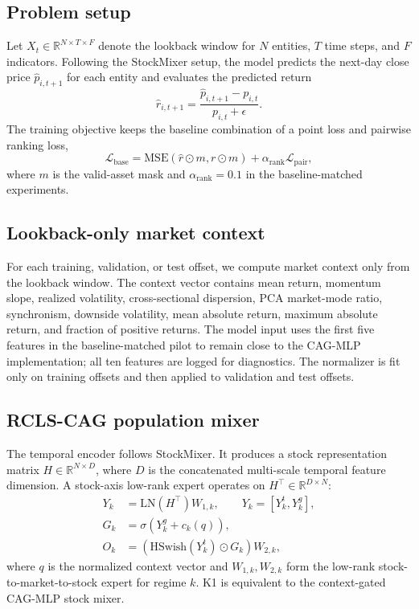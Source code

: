 \documentclass{article}
\begin{document}
\subsection{Problem setup}

Let $X_t \in \mathbb{R}^{N \times T \times F}$ denote the lookback window for $N$ entities, $T$ time steps, and $F$ indicators. Following the StockMixer setup, the model predicts the next-day close price $\hat{p}_{i,t+1}$ for each entity and evaluates the predicted return
\begin{equation}
    \hat{r}_{i,t+1} = \frac{\hat{p}_{i,t+1} - p_{i,t}}{p_{i,t} + \epsilon}.
\end{equation}
The training objective keeps the baseline combination of a point loss and pairwise ranking loss,
\begin{equation}
    \mathcal{L}_{\mathrm{base}} =
    \mathrm{MSE}(\hat{r} \odot m, r \odot m) +
    \alpha_{\mathrm{rank}}\mathcal{L}_{\mathrm{pair}},
\end{equation}
where $m$ is the valid-asset mask and $\alpha_{\mathrm{rank}}=0.1$ in the baseline-matched experiments.

\subsection{Lookback-only market context}

For each training, validation, or test offset, we compute market context only from the lookback window. The context vector contains mean return, momentum slope, realized volatility, cross-sectional dispersion, PCA market-mode ratio, synchronism, downside volatility, mean absolute return, maximum absolute return, and fraction of positive returns. The model input uses the first five features in the baseline-matched pilot to remain close to the CAG-MLP implementation; all ten features are logged for diagnostics. The normalizer is fit only on training offsets and then applied to validation and test offsets.

\subsection{RCLS-CAG population mixer}

The temporal encoder follows StockMixer. It produces a stock representation matrix $H \in \mathbb{R}^{N \times D}$, where $D$ is the concatenated multi-scale temporal feature dimension. A stock-axis low-rank expert operates on $H^\top \in \mathbb{R}^{D \times N}$:
\begin{align}
    Y_k &= \mathrm{LN}(H^\top) W_{1,k}, \qquad Y_k = [Y^t_k, Y^g_k], \\
    G_k &= \sigma(Y^g_k + c_k(q)), \\
    O_k &= \left(\mathrm{HSwish}(Y^t_k) \odot G_k\right) W_{2,k},
\end{align}
where $q$ is the normalized context vector and $W_{1,k},W_{2,k}$ form the low-rank stock-to-market-to-stock expert for regime $k$. K1 is equivalent to the context-gated CAG-MLP stock mixer.
\end{document}
